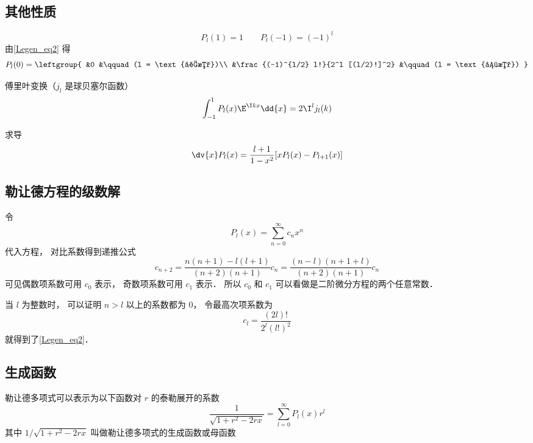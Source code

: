 \subsection{其他性质}
\begin{equation}
P_l(1) = 1 \qquad P_l(-1) = (-1)^l
\end{equation}
由\autoref{Legen_eq2} 得
\begin{equation}\label{Legen_eq5}
P_l(0) = \leftgroup{
&0 &\qquad (l = \text{奇数})\\
&\frac{(-1)^{l/2} l!}{2^l [(l/2)!]^2} &\qquad (l = \text{偶数})
}\end{equation}

傅里叶变换（$j_l$ 是球贝塞尔函数）
\begin{equation}\label{Legen_eq3}
\int_{-1}^1 P_l(x) \E^{\I k x} \dd{x} = 2 \I^l j_l(k)
\end{equation}

求导
\begin{equation}
\dv{x} P_l(x) = \frac{l+1}{1-x^2} [xP_l(x) - P_{l+1}(x)]
\end{equation}

\subsection{勒让德方程的级数解}
令
\begin{equation}
P_l(x) = \sum_{n = 0}^\infty c_n x^n
\end{equation}
代入方程， 对比系数得到递推公式
\begin{equation}
c_{n+2} = \frac{n(n+1)-l(l+1)}{(n+2)(n+1)}c_n = \frac{(n-l)(n+1+l)}{(n+2)(n+1)}c_n
\end{equation}
可见偶数项系数可用 $c_0$ 表示， 奇数项系数可用 $c_1$ 表示． 所以 $c_0$ 和 $c_1$ 可以看做是二阶微分方程的两个任意常数．

当 $l$ 为整数时， 可以证明 $n > l$ 以上的系数都为 0， 令最高次项系数为
\begin{equation}
c_l = \frac{(2l)!}{2^l (l!)^2}
\end{equation}
就得到了\autoref{Legen_eq2}．

\subsection{生成函数}
勒让德多项式可以表示为以下函数对 $r$ 的泰勒展开的系数
\begin{equation}
\frac{1}{\sqrt{1 + r^2 - 2rx}} = \sum_{l = 0}^\infty P_l(x) r^l
\end{equation}
其中 $1/\sqrt {1+ r^2 - 2rx}$ 叫做勒让德多项式的生成函数或母函数